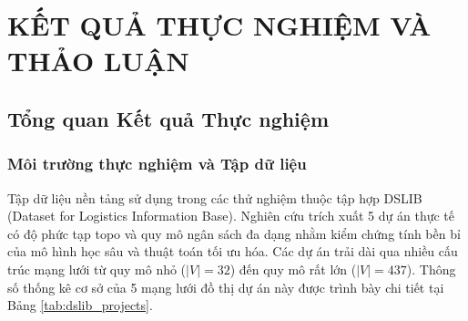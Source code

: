 \chapter{KẾT QUẢ THỰC NGHIỆM VÀ THẢO LUẬN}
\label{ch:chuong3_ket_qua}

\section{Tổng quan Kết quả Thực nghiệm}
\label{sec:3.1_tong_quan_ket_qua}

\subsection{Môi trường thực nghiệm và Tập dữ liệu}
\label{sec:3.1.1_moi_truong_va_du_lieu}

Tập dữ liệu nền tảng sử dụng trong các thử nghiệm thuộc tập hợp DSLIB (Dataset for Logistics Information Base). Nghiên cứu trích xuất 5 dự án thực tế có độ phức tạp topo và quy mô ngân sách đa dạng nhằm kiểm chứng tính bền bỉ của mô hình học sâu và thuật toán tối ưu hóa. Các dự án trải dài qua nhiều cấu trúc mạng lưới từ quy mô nhỏ ($|V|=32$) đến quy mô rất lớn ($|V|=437$). Thông số thống kê cơ sở của 5 mạng lưới đồ thị dự án này được trình bày chi tiết tại Bảng \ref{tab:dslib_projects}.

\begin{table}[H]
\centering
\caption{Thống kê đặc trưng cấu trúc đồ thị của 5 dự án trong tập dữ liệu DSLIB}
\label{tab:dslib_projects}
\small
{}
\end{table}

